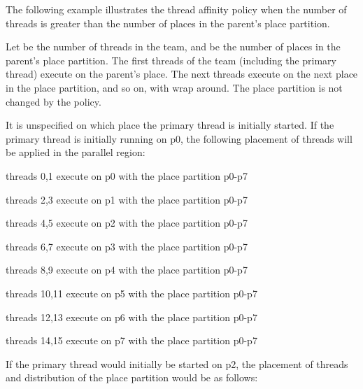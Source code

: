 The following example illustrates the  thread affinity policy when 
the number of threads is greater than the number of places in the parent's place 
partition.

Let  be the number of threads in the team, and  be the number of places in the 
parent's place partition. The first  threads of the team (including the primary
thread) execute on the parent's place. The next  threads execute on the next 
place in the place partition, and so on, with wrap around. The place partition 
is not changed by the  policy.



It is unspecified on which place the primary thread is initially started. If the 
primary thread is initially running on p0, the following placement of threads will 
be applied in the parallel region:

\begin{compactitem}
\item threads 0,1 execute on p0 with the place partition p0-p7

\item threads 2,3 execute on p1 with the place partition p0-p7

\item threads 4,5 execute on p2 with the place partition p0-p7

\item threads 6,7 execute on p3 with the place partition p0-p7

\item threads 8,9 execute on p4 with the place partition p0-p7

\item threads 10,11 execute on p5 with the place partition p0-p7

\item threads 12,13 execute on p6 with the place partition p0-p7

\item threads 14,15 execute on p7 with the place partition p0-p7
\end{compactitem}

If the primary thread would initially be started on p2, the placement of threads 
and distribution of the place partition would be as follows:

